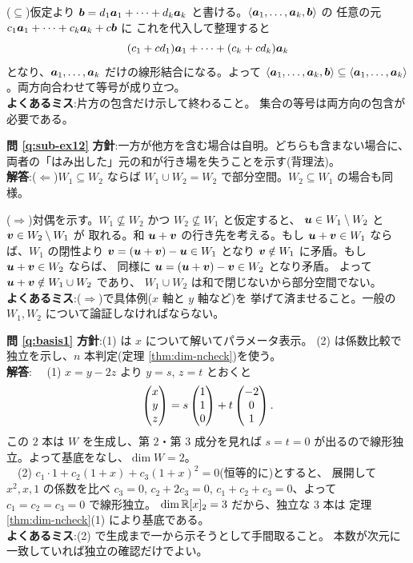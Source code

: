 ($\subseteq$)仮定より $\bm{b} = d_1\bm{a}_1 + \cdots + d_k\bm{a}_k$
と書ける。$\langle \bm{a}_1, \dots, \bm{a}_k, \bm{b} \rangle$ の
任意の元 $c_1\bm{a}_1 + \cdots + c_k\bm{a}_k + c\bm{b}$ に
これを代入して整理すると
\[
(c_1 + c d_1)\bm{a}_1 + \cdots + (c_k + c d_k)\bm{a}_k
\]
となり、$\bm{a}_1, \dots, \bm{a}_k$ だけの線形結合になる。よって
$\langle \bm{a}_1, \dots, \bm{a}_k, \bm{b} \rangle \subseteq
\langle \bm{a}_1, \dots, \bm{a}_k \rangle$。両方向合わせて等号が成り立つ。\\
\textbf{よくあるミス}:片方の包含だけ示して終わること。
集合の等号は両方向の包含が必要である。

\bigskip
\noindent\textbf{問 \ref{q:sub-ex12}}\quad
\textbf{方針}:一方が他方を含む場合は自明。どちらも含まない場合に、
両者の「はみ出した」元の和が行き場を失うことを示す(背理法)。\\
\textbf{解答}:($\Leftarrow$)$W_1 \subseteq W_2$ ならば
$W_1 \cup W_2 = W_2$ で部分空間。$W_2 \subseteq W_1$ の場合も同様。

($\Rightarrow$)対偶を示す。$W_1 \not\subseteq W_2$ かつ
$W_2 \not\subseteq W_1$ と仮定すると、
$\bm{u} \in W_1 \setminus W_2$ と $\bm{v} \in W_2 \setminus W_1$ が
取れる。和 $\bm{u} + \bm{v}$ の行き先を考える。もし
$\bm{u} + \bm{v} \in W_1$ ならば、$W_1$ の閉性より
$\bm{v} = (\bm{u} + \bm{v}) - \bm{u} \in W_1$ となり
$\bm{v} \notin W_1$ に矛盾。もし $\bm{u} + \bm{v} \in W_2$ ならば、
同様に $\bm{u} = (\bm{u} + \bm{v}) - \bm{v} \in W_2$ となり矛盾。
よって $\bm{u} + \bm{v} \notin W_1 \cup W_2$ であり、
$W_1 \cup W_2$ は和で閉じないから部分空間でない。\\
\textbf{よくあるミス}:($\Rightarrow$)で具体例($x$ 軸と $y$ 軸など)を
挙げて済ませること。一般の $W_1, W_2$ について論証しなければならない。

\bigskip
\noindent\textbf{問 \ref{q:basis1}}\quad
\textbf{方針}:(1) は $x$ について解いてパラメータ表示。
(2) は係数比較で独立を示し、$n$ 本判定(定理 \ref{thm:dim-ncheck})を使う。\\
\textbf{解答}:
　(1) $x = y - 2z$ より $y = s$, $z = t$ とおくと
\[
\begin{pmatrix}x \\ y \\ z\end{pmatrix} = s\begin{pmatrix}1 \\ 1 \\ 0\end{pmatrix} + t\begin{pmatrix}-2 \\ 0 \\ 1\end{pmatrix}.
\]
この $2$ 本は $W$ を生成し、第 $2$・第 $3$ 成分を見れば
$s = t = 0$ が出るので線形独立。よって基底をなし、$\dim W = 2$。\\
　(2) $c_1 \cdot 1 + c_2(1 + x) + c_3(1 + x)^2 = 0$(恒等的に)とすると、
展開して $x^2, x, 1$ の係数を比べ $c_3 = 0$, $c_2 + 2c_3 = 0$,
$c_1 + c_2 + c_3 = 0$、よって $c_1 = c_2 = c_3 = 0$ で線形独立。
$\dim \mathbb{R}[x]_2 = 3$ だから、独立な $3$ 本は
定理 \ref{thm:dim-ncheck}(1) により基底である。\\
\textbf{よくあるミス}:(2) で生成まで一から示そうとして手間取ること。
本数が次元に一致していれば独立の確認だけでよい。

